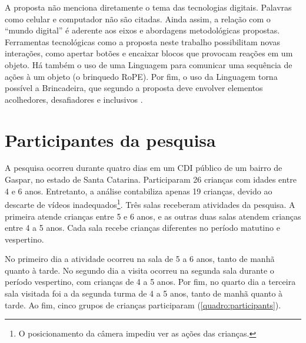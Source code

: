 A proposta não menciona diretamente o tema das tecnologias digitais. Palavras como celular e computador não são citadas. Ainda assim, a relação com o “mundo digital” é aderente aos eixos e abordagens metodológicas propostas. Ferramentas tecnológicas como a proposta neste trabalho possibilitam novas interações, como apertar botões e encaixar blocos que provocam reações em um objeto. Há também o uso de uma Linguagem para comunicar uma sequência de ações à um objeto (o brinquedo RoPE). Por fim, o uso da Linguagem torna possível a Brincadeira, que segundo a proposta deve envolver elementos acolhedores, desafiadores e inclusivos \cite[p.50]{gaspar_proposta_2010}. 


\section{Participantes da pesquisa}
\label{sec:participantes}

A pesquisa ocorreu durante quatro dias em um CDI público de um bairro de Gaspar, no estado de Santa Catarina. Participaram 26 crianças com idades entre 4 e 6 anos. Entretanto, a análise contabiliza apenas 19 crianças, devido ao descarte de vídeos inadequados\footnote{O posicionamento da câmera impediu ver as ações das crianças.}. Três salas receberam atividades da pesquisa. A primeira atende crianças entre 5 e 6 anos, e as outras duas salas atendem crianças entre 4 a 5 anos. Cada sala recebe crianças diferentes no período matutino e vespertino.

No primeiro dia a atividade ocorreu na sala de 5 a 6 anos, tanto de manhã quanto à tarde. No segundo dia a visita ocorreu na segunda sala durante o período vespertino, com crianças de 4 a 5 anos. Por fim, no quarto dia a terceira sala visitada foi a da segunda turma de 4 a 5 anos, tanto de manhã quanto à tarde. Ao fim, cinco grupos de crianças participaram (\autoref{quadro:participants}).

